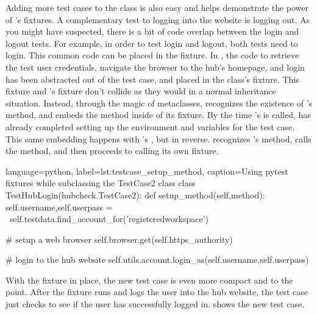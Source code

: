 Adding more test cases to the  class is also easy and
helps demonstrate the power of 's fixtures. A complementary
test to logging into the website is logging out. As you might have suspected,
there is a bit of code overlap between the login and logout tests. For example,
in order to test login and logout, both tests need to login.  This common code
can be placed in the  fixture. In
, the code to retrieve the test user
credentials, navigate the browser to the hub's homepage, and login has been
abstracted out of the  test case, and placed
in the  class's  fixture. This
fixture and 's  fixture don't
collide as they would in a normal inheritance situation.  Instead, through the
magic of metaclasses,  recognizes the existence of
's  method, and embeds the
method inside of its  fixture.  By the time
's  is called,
 has already completed setting up the environment and
variables for the test case. This same embedding happens with
's , but in reverse.
 recognizes 's
 method, calls the method, and then proceeds to
calling its own  fixture.

\begin{xcode}{%
  language=python,%
  label=lst:testcase_setup_method,%
  caption={Using pytest fixtures while subclassing the TestCase2 class}%
}
class TestHubLogin(hubcheck.TestCase2):
    def setup_method(self,method):
        self.username,self.userpass = \
            self.testdata.find_account_for('registeredworkspace')

        # setup a web browser
        self.browser.get(self.https_authority)

        # login to the hub website
        self.utils.account.login_as(self.username,self.userpass)
\end{xcode}



With the  fixture in place, the new
 test case is even more compact and to the
point. After the \xfmethod{setup\_method()} fixture runs and logs the user into
the hub website, the \xfmethod{test\_website\_login()} test case just checks to
see if the user has successfully logged in.
 shows the new
 test case.


